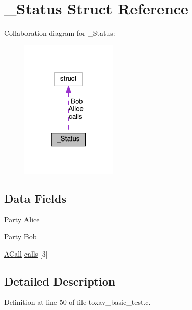 \hypertarget{struct___status}{\section{\+\_\+\+Status Struct Reference}
\label{struct___status}
}


Collaboration diagram for \+\_\+\+Status\+:
\nopagebreak
\begin{figure}[H]
\begin{center}
\leavevmode
\includegraphics[width=130pt]{da/d08/struct___status__coll__graph}
\end{center}
\end{figure}
\subsection*{Data Fields}
\begin{DoxyCompactItemize}
\item 
\hyperlink{toxav__basic__test_8c_a6b3eabc1984dea93c1fe4b44079315f2}{Party} \hyperlink{struct___status_a0fd20957e107227630b542b146c276d4}{Alice}
\item 
\hyperlink{toxav__basic__test_8c_a6b3eabc1984dea93c1fe4b44079315f2}{Party} \hyperlink{struct___status_a78cf423939bd332fd6e5ddae67134e01}{Bob}
\item 
\hyperlink{toxav__many__test_8c_a08f86194a48a5220da2dd589269e0bf3}{A\+Call} \hyperlink{struct___status_a2f6221bbb611e0d485e26cd2722bd7ee}{calls} \mbox{[}3\mbox{]}
\end{DoxyCompactItemize}


\subsection{Detailed Description}


Definition at line 50 of file toxav\+\_\+basic\+\_\+test.\+c.



